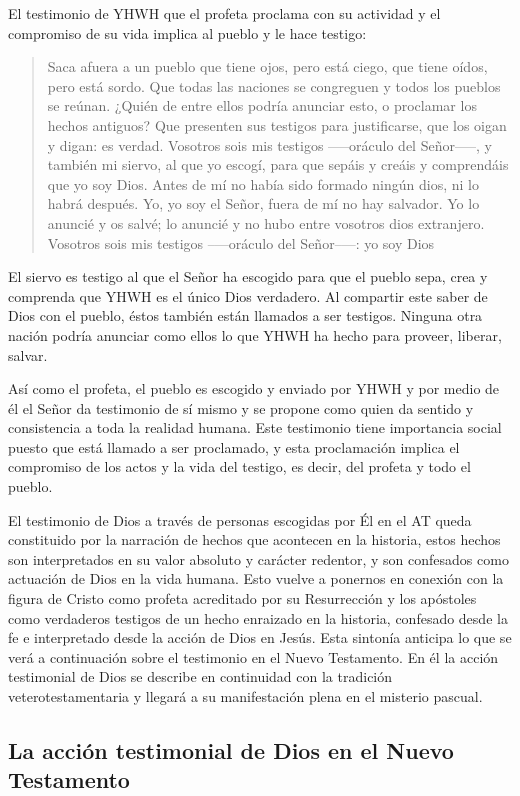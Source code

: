 El testimonio de YHWH que el profeta proclama con su actividad y el compromiso de su vida implica al pueblo y le hace testigo: \blockquote[][\,(Is 43,8-12)]{Saca afuera a un pueblo que tiene ojos, pero está ciego, que tiene oídos, pero está sordo. Que todas las naciones se congreguen y todos los pueblos se reúnan. ¿Quién de entre ellos podría anunciar esto, o proclamar los hechos antiguos? Que presenten sus testigos para justificarse, que los oigan y digan: es verdad. Vosotros sois mis testigos --—oráculo del Señor--—, y también mi siervo, al que yo escogí, para que sepáis y creáis y comprendáis que yo soy Dios. Antes de mí no había sido formado ningún dios, ni lo habrá después. Yo, yo soy el Señor, fuera de mí no hay salvador. Yo lo anuncié y os salvé; lo anuncié y no hubo entre vosotros dios extranjero. Vosotros sois mis testigos --—oráculo del Señor--—: yo soy Dios}. El siervo es testigo al que el Señor ha escogido para que el pueblo sepa, crea y comprenda que YHWH es el único Dios verdadero. Al compartir este saber de Dios con el pueblo, éstos también están llamados a ser testigos. Ninguna otra nación podría anunciar como ellos lo que YHWH ha hecho para proveer, liberar, salvar.

Así como el profeta, el pueblo es escogido y enviado por YHWH y por medio de él el Señor da testimonio de sí mismo y se propone como quien da sentido y consistencia a toda la realidad humana. Este testimonio tiene importancia social puesto que está llamado a ser proclamado, y esta proclamación implica el compromiso de los actos y la vida del testigo, es decir, del profeta y todo el pueblo\autocite[Cf.][1526-1527]{latourelle2000testimonio}.

El testimonio de Dios a través de personas escogidas por Él en el AT queda constituido por la narración de hechos que acontecen en la historia, estos hechos son interpretados en su valor absoluto y carácter redentor, y son confesados como actuación de Dios en la vida humana\autocite[Cf.][119]{prades2015testimonio}. Esto vuelve a ponernos en conexión con la figura de Cristo como profeta acreditado por su Resurrección y los apóstoles como verdaderos testigos de un hecho enraizado en la historia, confesado desde la fe e interpretado desde la acción de Dios en Jesús. Esta sintonía anticipa lo que se verá a continuación sobre el testimonio en el Nuevo Testamento. En él la acción testimonial de Dios se describe en continuidad con la tradición veterotestamentaria y llegará a su manifestación plena en el misterio pascual.

\subsection{La acción testimonial de Dios en el Nuevo Testamento}

